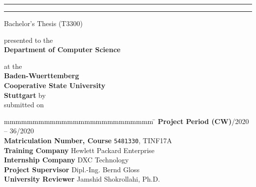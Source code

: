 \hfill
{}

\vfill\vfill

\begin{center}
	\rule{\linewidth}{1pt}
	{
		\Huge \bfseries
			\@title
		\par	
	}
	\vspace{-0.2cm}
	\rule{\linewidth}{1pt}
	

	Bachelor's Thesis (T3300)
	\vfill
	
	presented to the \\ \textbf{Department of Computer Science}
	
	at the \\ \textbf{Baden-Wuerttemberg \\Cooperative State University\\Stuttgart}
	\vfill
	by \\ \textbf{\textsc{\@author}}
	\vfill \vfill
	submitted on \\ \textbf{\@date}
\end{center}

\vfill\vfill

\begin{tabbing}
	mmmmmmmmmmmmmmmmmmmmmmmmmm				\= \kill
	\textbf{Project Period (CW)}/2020 -- 36/2020 \\
	\textbf{Matriculation Number, Course} \> \texttt{5481330}, TINF17A \\
	\textbf{Training Company} \> Hewlett Packard Enterprise \\
	\textbf{Internship Company} \> DXC Technology \\
	\textbf{Project Supervisor} \> Dipl.-Ing. Bernd Gloss \\
	\textbf{University Reviewer} \> Jamshid Shokrollahi, Ph.D.
\end{tabbing}
